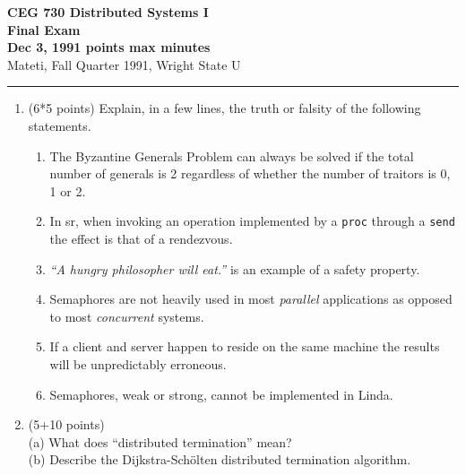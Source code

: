 \textheight 8in %

\def\fat{\framebox[1mm]{\rule{0mm}{2mm}}}
\def\rar{\rightarrow}
\def\pr{$\parallel$}
\def\CSP{{\sc csp}}
\def\RPC{{\sc rpc}}
\def\SR{{\sc sr}}
\parindent=0pt



{\bf CEG 
\large \bf 730 Distributed Systems I\\[5pt]
\large Final Exam\\[10pt]
Dec 3, 1991  points max  minutes\\
}
\bigskip
{Mateti,  Fall Quarter 1991, Wright State U}\\[-5pt]
\hrule

\begin{enumerate}

\item (6*5 points)
Explain, in a few lines, the truth or falsity of the following
statements.

\begin{enumerate}

\item
The Byzantine Generals Problem can always be solved if the total
number of generals is 2 regardless of whether the number of traitors
is 0, 1 or 2.

\item
In \SR, when invoking an operation implemented by a {\tt proc} through
a {\tt send} the effect is that of a rendezvous.

\item
{\sl ``A hungry philosopher will eat.''} is an example of a safety
property.

\item
Semaphores are not heavily used in most {\em parallel} applications as
opposed to most {\em concurrent} systems.

\item
If a client and server happen to reside on the same machine the
results will be unpredictably erroneous.

\item
Semaphores, weak or strong, cannot be implemented in Linda.


\end{enumerate}

\vfill
\item (5+10 points)\\
(a) What does ``distributed termination'' mean?\\
(b) Describe the Dijkstra-Sch\"olten distributed termination algorithm.


\end{enumerate}
